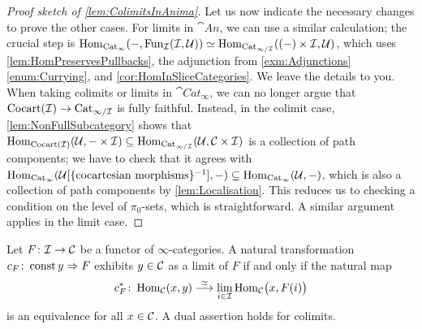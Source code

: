 \begin{proof}[Proof sketch of \cref{lem:ColimitsInAnima}]
	Let us now indicate the necessary changes to prove the other cases. For limits in $\cat{An}$, we can use a similar calculation; the crucial step is $\operatorname{Hom}_{\mathrm{Cat}_\infty}(-,\operatorname{Fun}_{\mathcal{I}}(\mathcal{I},\mathcal{U}))\simeq \operatorname{Hom}_{\mathrm{Cat}_{\infty/\mathcal{I}}}((-)\times\mathcal{I},\mathcal{U})$, which uses \cref{lem:HomPreservesPullbacks}, the adjunction from \cref{exm:Adjunctions}\cref{enum:Currying}, and \cref{cor:HomInSliceCategories}. We leave the details to you. When taking colimits or limits in $\cat{Cat}_\infty$, we can no longer argue that $\mathrm{Cocart}(\mathcal{I})\rightarrow \mathrm{Cat}_{\infty/\mathcal{I}}$ is fully faithful. Instead, in the colimit case, \cref{lem:NonFullSubcategory} shows that $\operatorname{Hom}_{\mathrm{Cocart}(\mathcal{I})}(\mathcal{U},-\times\mathcal{I})\subseteq \operatorname{Hom}_{\mathrm{Cat}_{\infty/\mathcal{I}}}(\mathcal{U},\mathcal{C}\times\mathcal{I})$ is a collection of path components; we have to check that it agrees with $\operatorname{Hom}_{\mathrm{Cat}_\infty}(\mathcal{U}[\{\text{cocartesian morphisms}\}^{-1}],-)\subseteq \operatorname{Hom}_{\mathrm{Cat}_\infty}(\mathcal{U},-)$, which is also a collection of path components by \cref{lem:Localisation}. This reduces us to checking a condition on the level of $\pi_0$-sets, which is straightforward. A similar argument applies in the limit case.
\end{proof}
\begin{cor}\label{cor:HomPreservesColimits}
	Let $F\colon \mathcal{I}\rightarrow\mathcal{C}$ be a functor of $\infty$-categories. A natural transformation $c_F\colon \operatorname{const} y\Rightarrow F$ exhibits $y\in \mathcal{C}$ as a limit of $F$ if and only if the natural map
	\begin{equation*}
		c_F^*\colon \operatorname{Hom}_{\mathcal{C}}(x,y)\overset{\simeq}{\longrightarrow}\operatorname*{lim}_{i\in\mathcal{I}}\operatorname{Hom}_{\mathcal{C}}\bigl(x,F(i)\bigr)
	\end{equation*}
	is an equivalence for all $x\in \mathcal{C}$. A dual assertion holds for colimits.
\end{cor}

